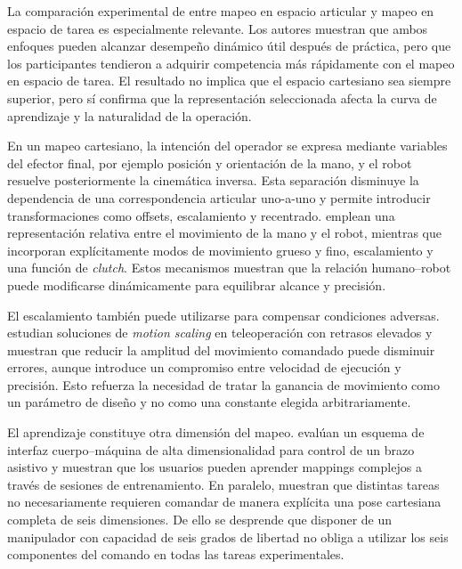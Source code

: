 La comparación experimental de \textcite{wang2021mapping} entre mapeo en espacio articular y mapeo en espacio de tarea es especialmente relevante. Los autores muestran que ambos enfoques pueden alcanzar desempeño dinámico útil después de práctica, pero que los participantes tendieron a adquirir competencia más rápidamente con el mapeo en espacio de tarea. El resultado no implica que el espacio cartesiano sea siempre superior, pero sí confirma que la representación seleccionada afecta la curva de aprendizaje y la naturalidad de la operación.

En un mapeo cartesiano, la intención del operador se expresa mediante variables del efector final, por ejemplo posición y orientación de la mano, y el robot resuelve posteriormente la cinemática inversa. Esta separación disminuye la dependencia de una correspondencia articular uno-a-uno y permite introducir transformaciones como offsets, escalamiento y recentrado. \textcite{skulj2021wearable} emplean una representación relativa entre el movimiento de la mano y el robot, mientras que \textcite{zhang2019gesture} incorporan explícitamente modos de movimiento grueso y fino, escalamiento y una función de \textit{clutch}. Estos mecanismos muestran que la relación humano--robot puede modificarse dinámicamente para equilibrar alcance y precisión.

El escalamiento también puede utilizarse para compensar condiciones adversas. \textcite{richter2019scaling} estudian soluciones de \textit{motion scaling} en teleoperación con retrasos elevados y muestran que reducir la amplitud del movimiento comandado puede disminuir errores, aunque introduce un compromiso entre velocidad de ejecución y precisión. Esto refuerza la necesidad de tratar la ganancia de movimiento como un parámetro de diseño y no como una constante elegida arbitrariamente.

El aprendizaje constituye otra dimensión del mapeo. \textcite{lee2023bodymachine} evalúan un esquema de interfaz cuerpo--máquina de alta dimensionalidad para control de un brazo asistivo y muestran que los usuarios pueden aprender mappings complejos a través de sesiones de entrenamiento. En paralelo, \textcite{weigend2025wearmocap} muestran que distintas tareas no necesariamente requieren comandar de manera explícita una pose cartesiana completa de seis dimensiones. De ello se desprende que disponer de un manipulador con capacidad de seis grados de libertad no obliga a utilizar los seis componentes del comando en todas las tareas experimentales.

